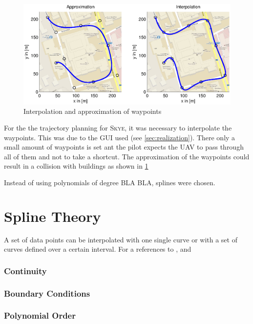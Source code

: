\begin{figure}[h]
  \begin{minipage}[t]{0.9\textwidth}
    \includegraphics[width = \textwidth]{graphics/ApproxInterpol.eps}
  \end{minipage}
  \hfill
  \begin{minipage}[t]{0.8\textwidth}
  \end{minipage}
  \caption{Interpolation and approximation of waypoints}
  \label{fig:ApproxInterpol}
\end{figure}

For the the trajectory planning for \textsc{Skye}, it was necessary to interpolate the waypoints. This was due to the GUI used (see \ref{sec:realization}). There only a small amount of waypoints is set ant the pilot expects the UAV to pass through all of them and not to take a shortcut. The approximation of the waypoints could result in a collision with buildings as shown in \ref{fig:ApproxInterpol}


Instead of using polynomials of degree BLA BLA, splines were chosen.


\section{Spline Theory}
A set of data points can be interpolated with one single curve or with a set of curves defined over a certain interval.  For a 
\label{sec:splineTheory}
references to \cite{engeln}, \cite{biagiotti} and \cite{doessegger}
\subsubsection{Continuity}
\subsubsection{Boundary Conditions}
\subsubsection{Polynomial Order}
